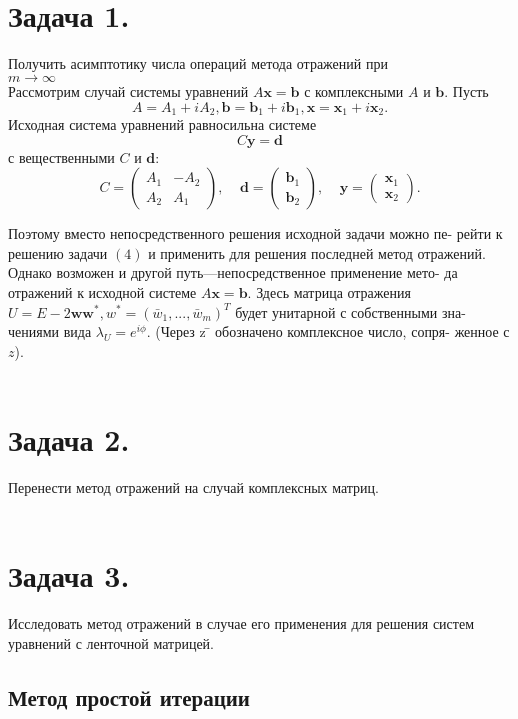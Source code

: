 \documentclass[a4paper, twoside, 12pt]{article}
\begin{document}
\\ \\ 
\noindent
\chapter{\textbf{Задача 1.}}
Получить асимптотику числа операций метода отражений при\\
$m \to \infty $
\\
\indent
Рассмотрим случай системы уравнений $A\textbf{x} = \textbf{b}$ с комплексными $A$ и
$\textbf{b}$. Пусть
\[
A = A_{1} + iA_{2}, 
 \textbf{b} = \textbf{b}_{1} + i \textbf{b}_{1},  \textbf{x} = \textbf{x}_{1} + i\textbf{x}_{2}.
\]
Исходная система уравнений равносильна системе
\[
C\textbf{y} = \textbf{d}
\]
с вещественными $C$ и $\textbf{d}:$
\[
C = 
\left(
\begin{array}{ccc}
A_{1} & -A_{2} \\
A_{2} & A_{1}
\end{array}
\right) ,  \; \;  \; \;
\textbf{d} = 
\left(
\begin{array}{ccc}
\textbf{b}_{1}  \\
\textbf{b}_{2}
\end{array}
\right) ,   \; \;  \; \;
\textbf{y} = 
\left(
\begin{array}{ccc}
\textbf{x}_{1}  \\
\textbf{x}_{2}
\end{array}
\right)
.
\]

Поэтому вместо непосредственного решения исходной задачи можно пе- рейти к решению задачи $(4)$ и 
применить для решения последней метод отражений.
\\
\indent
Однако возможен и другой путь—непосредственное применение мето- да отражений к исходной системе $A\textbf{x} = \textbf{b}$. Здесь матрица отражения $U = E - 2\textbf{w}\textbf{w}^{*}, w^{*} = (\bar w_{1}, ..., \bar w_{m})^T $ будет унитарной с собственными зна- чениями вида $\lambda_{U} = e^{i \phi}$. (Через z ̄ обозначено комплексное число, сопря- женное с $z$).
\\ \\ 
\chapter{\textbf{Задача 2. }} 
Перенести метод отражений на случай комплексных матриц.
\\ \\
\chapter{\textbf{Задача 3. }} 
Исследовать метод отражений в случае его применения для
решения систем уравнений с ленточной матрицей.
\\ 
\begin{center}
    \section*{  Метод простой итерации
}
\end{center}
\end{document}
